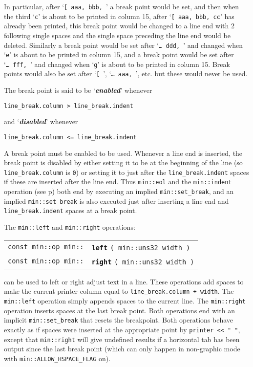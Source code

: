 \documentclass[12pt]{article}
\makeatletter
\newcommand{\mkey}[2]{{\bf \em #1}\index{#1!#2}}
\newcommand{\ttindex}[1]{\index{#1@{\tt #1}}}
\newcommand{\minindex}[1]{\ttindex{min::#1}\ttindex{#1}}
\newcommand{\pagref}[1]{p\pageref{#1}}
\newcommand{\EOL}{\penalty \exhyphenpenalty}
\newenvironment{indpar}[1][0.3in]%
	{\begin{list}{}%
		     {\setlength{\itemsep}{0in}%
		      \setlength{\topsep}{0in}%
		      \setlength{\parsep}{1ex}%
		      \setlength{\labelwidth}{#1}%
		      \setlength{\leftmargin}{#1}%
		      \addtolength{\leftmargin}{\labelsep}}%
	 \item}%
	{\end{list}}
\newcommand{\LABEL}[1]{\label{#1}}
\newcommand{\MINKEY}[1]{{\tt \bf #1}\minindex{#1}}
\makeatother
\begin{document}
In particular, after `{\tt [~aaa,~bbb,~}' a break point would be set,
and then when the third `{\tt c}' is about to be printed in column 15,
after `{\tt [~aaa,~bbb,~cc}' has already been printed, this
break point would be changed to a line end with 2 following single
spaces and the single space preceding the line end would be deleted.  Similarly
a break point would be set after `{\tt \ldots~ddd,~}' and changed
when `{\tt e}' is about to be printed in column 15, and a break
point would be set after `{\tt \ldots~fff,~}' and changed
when `{\tt g}' is about to be printed in column 15.  Break points
would also be set after `{\tt [~}', `{\tt \ldots~aaa,~}', etc. but
these would never be used.

The break point is said to be `\mkey{enabled}{break point}' whenever
\begin{center}
\tt line\_break.column > line\_break.indent
\end{center}
and `\mkey{disabled}{break point}' whenever
\begin{center}
\tt line\_break.column <= line\_break.indent
\end{center}
A break point must be enabled to be used.
Whenever a line end is inserted, the break point is
disabled by either setting it to be at the beginning of the line
(so {\tt line\_\EOL break.column} is {\tt 0}) or setting it to
just after the {\tt line\_\EOL break.indent} spaces
if these are inserted after the line end.
Thus {\tt min::\EOL eol} and the {\tt min::\EOL indent} operation
(see \pagref{MIN::INDENT}) both end by executing
an implied {\tt min::\EOL set\_\EOL break},
and an implied {\tt min::\EOL set\_\EOL break}
is also executed just after inserting a line end
and {\tt line\_\EOL break.indent} spaces at a break point.

The {\tt min::left} and {\tt min::right} operations:

\begin{indpar}[1em]\begin{tabular}{r@{}l}
\verb|const min::op min::| & \MINKEY{left} \verb|( min::uns32 width )|
\LABEL{MIN::LEFT} \\
\verb|const min::op min::| & \MINKEY{right} \verb|( min::uns32 width )|
\LABEL{MIN::RIGHT} \\
\end{tabular}\end{indpar}

can be used to left or right adjust text in a line.
These operations add spaces to make the current printer column
equal to {\tt line\_\EOL break.column + width}.
The {\tt min::\EOL left} operation simply appends spaces to the
current line.  The {\tt min::\EOL right} operation inserts spaces
at the last break point.  Both operations end with an implicit
{\tt min::\EOL set\_\EOL break} that resets the breakpoint.
Both operations behave exactly as if spaces were inserted at the
appropriate point by {\tt printer <{}< "~"}, except that
{\tt min::right} will give undefined results if a horizontal
tab has been output since the last break point (which can only
happen in non-graphic mode with
{\tt min::\EOL ALLOW\_\EOL HSPACE\_\EOL FLAG} on).
\end{document}
